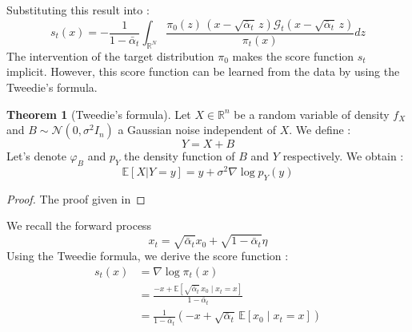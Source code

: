 \documentclass[a4paper,10pt]{article}
\theoremstyle{definition} %
\theoremstyle{definition} %
\theoremstyle{definition} %
\newtheorem{theorem}[definition]{Theorem}
\theoremstyle{definition} %
\newcommand{\R}{\mathbb{R}}
\newcommand{\0}{\boldsymbol{0}}
\begin{document}
Substituting this result into  :
\begin{equation}\label{eq:score_formule_analytique}
    s_t(x) = -\frac{1}{1- \bar \alpha_t} \int_{\R^N} \frac{\pi_0(z)\, (x - \sqrt{\bar \alpha_t} \,z) \mathcal{G}_t(x - \sqrt{\bar \alpha_t} \,z)}{\pi_t(x)} dz
\end{equation}
The intervention of the target distribution $\pi_0$ makes the score function $s_t$ implicit. However, this score function can be learned from the data by using the Tweedie's formula.
\begin{theorem}[Tweedie's formula]\label{theo:formule_de_Tweedie}
    Let $X \in \mathbb{R}^n$ be a random variable of density $f_X$ and $B \sim \mathcal{N}(0, \sigma^2 I_n)$ a Gaussian noise independent of $X$. We define :
    \[ Y = X + B \]
    Let's denote $\varphi_B$ and $p_Y$ the density function of $B$ and $Y$ respectively. We obtain :
    \[ \mathbb{E}[X | Y = y] = y + \sigma^2 \nabla \log p_Y(y) \]
\end{theorem}
\begin{proof}
    The proof given in 
\end{proof}
We recall the forward process
\[ x_t = \sqrt{\bar \alpha_t} x_0 + \sqrt{1 - \bar \alpha_t} \eta \]
Using the  Tweedie formula, we derive the score function :
\begin{align*}
s_t(x) &= \nabla \log \pi_t(x) \\
&= \frac{-x + \mathbb{E} \left[\sqrt{\bar \alpha_t}\, x_0 \mid x_t = x \right]}{1 - \bar \alpha_t} \\
&= \frac{1}{1 - \bar \alpha_t} \left( -x + \sqrt{\bar \alpha_t} \,\mathbb{E} \left[ x_0 \mid x_t = x \right] \right)
\end{align*}
\end{document}
